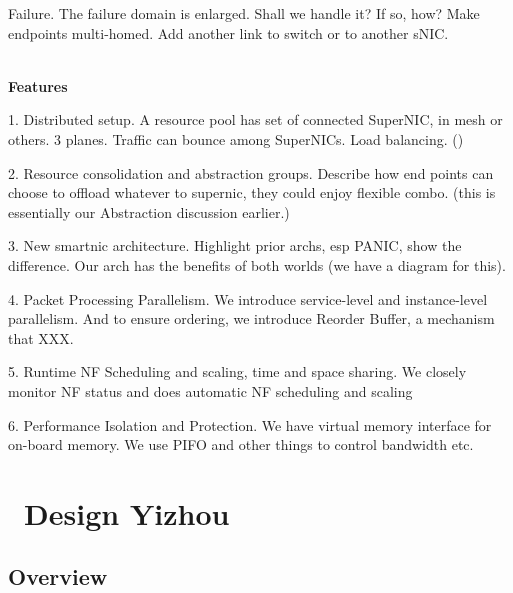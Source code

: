 \begin{itemize}[leftmargin=0cm,itemindent=.35cm]
 Failure.
The failure domain is enlarged.
Shall we handle it? If so, how?
Make endpoints multi-homed. Add another link
to switch or to another sNIC.



\end{itemize}
%
\\


\textbf{Features}

1. Distributed setup.
A resource pool has set of connected SuperNIC, in mesh or others.
3 planes.
Traffic can bounce among SuperNICs.
Load balancing. ()

2. Resource consolidation and abstraction groups.
Describe how end points can choose to offload whatever to supernic,
they could enjoy flexible combo. (this is essentially our Abstraction discussion earlier.)

3. New smartnic architecture.
Highlight prior archs, esp PANIC, show the difference.
Our arch has the benefits of both worlds (we have a diagram for this).

4. Packet Processing Parallelism.
We introduce service-level and instance-level parallelism.
And to ensure ordering, we introduce Reorder Buffer, a mechanism that XXX.

5. Runtime NF Scheduling and scaling, time and space sharing.
We closely monitor NF status and does automatic NF scheduling and scaling

6. Performance Isolation and Protection.
We have virtual memory interface for on-board memory.
We use PIFO and other things to control bandwidth etc.
\fi

\section{\sysname\ Design Yizhou}
\label{sec:design}

\subsection{Overview}

